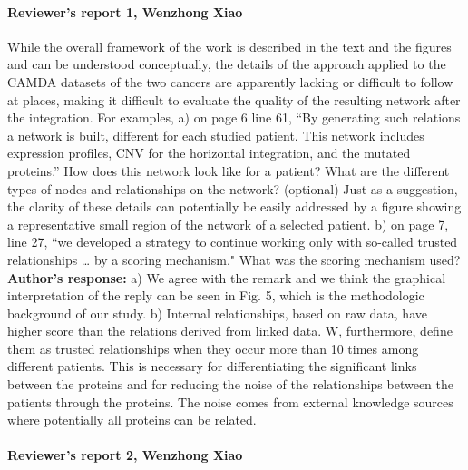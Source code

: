 \documentclass{bmcart}
\begin{document}
\paragraph {Reviewer's report 1, Wenzhong Xiao}
While the overall framework of the work is described in the text and the figures and can be understood conceptually, the details of the approach applied to the CAMDA datasets of the two cancers are apparently lacking or difficult to follow at places, making it difficult to evaluate the quality of the resulting network after the integration. For examples,
a) on page 6 line 61, “By generating such relations a network is built, different for each studied patient. This network includes expression profiles, CNV for the horizontal integration, and the mutated proteins.” How does this network look like for a patient? What are the different types of nodes and relationships on the network? (optional) Just as a suggestion, the clarity of these details can potentially be easily addressed by a figure showing a representative small region of the network of a selected patient.
b) on page 7, line 27, “we developed a strategy to continue working only with so-called trusted relationships … by a scoring mechanism." What was the scoring mechanism used? 
\newline \textbf{Author's response:}
 a) We agree with the remark and we think the graphical interpretation of the reply can be seen in Fig. 5, which is the methodologic background of our study. b) Internal relationships, based on raw data, have higher score than the relations derived from linked data. W, furthermore, define them as trusted relationships when they occur more than 10 times among different patients. This is necessary for differentiating the significant links between the proteins and for reducing the noise of the relationships between the patients through the proteins. The noise comes from external knowledge sources where potentially all proteins can be related.
 
 

\paragraph {Reviewer's report 2, Wenzhong Xiao}
\end{document}
